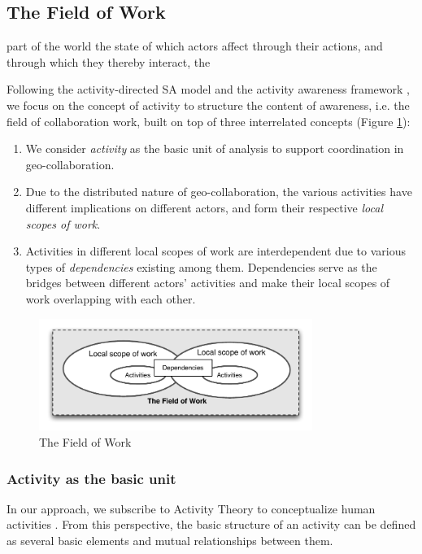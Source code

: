 \subsection{The Field of Work} %
\label{sub:the_field_of_work}

part of the world the state of which actors affect through their actions, and through which they thereby interact, the


Following the activity-directed SA model \cite{Bedny1999} and the activity awareness framework \cite{carroll2003a}, we focus on the concept of activity to structure the content of awareness, i.e. the field of collaboration work, built on top of three interrelated concepts (Figure \ref{fig:field_of_work}):

\begin{enumerate}
	\item We consider \emph{activity} as the basic unit of analysis to support coordination in geo-collaboration.
	\item Due to the distributed nature of geo-collaboration, the various activities have different implications on different actors, and form their respective \emph{local scopes of work}.
	\item Activities in different local scopes of work are interdependent due to various types of \emph{dependencies} existing among them. Dependencies serve as the bridges between different actors' activities and make their local scopes of work overlapping with each other. 
\end{enumerate}

\begin{figure}[htbp] %
   \centering
   \includegraphics[width=3.5in]{field_of_work.pdf} 
   \caption{The Field of Work}
   \label{fig:field_of_work}
\end{figure}

\subsubsection{Activity as the basic unit} %
\label{ssub:activity_basic_unit}
In our approach, we subscribe to Activity Theory to conceptualize human activities \cite{nardi1996context}. From this perspective, the basic structure of an activity can be defined as several basic elements and mutual relationships between them.

